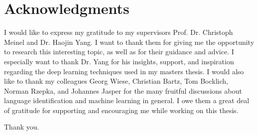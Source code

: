 \section*{\LARGE Acknowledgments}
I would like to express my gratitude to my supervisors Prof. Dr. Christoph Meinel and Dr. Haojin Yang. I want to thank them for giving me the opportunity to research this interesting topic, as well as for their guidance and advice. I especially want to thank Dr. Yang for his insights, support, and inspiration regarding the deep learning techniques used in my masters thesis.
I would also like to thank my colleagues Georg Wiese, Christian Bartz, Tom Bocklich, Norman Rzepka, and Johannes Jasper for the many fruitful discussions about language identification and machine learning in general. I owe them a great deal of gratitude for supporting and encouraging me while working on this thesis.

Thank you.

